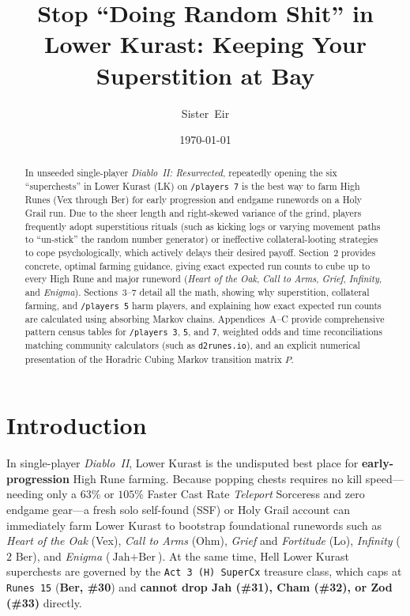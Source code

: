 \documentclass[11pt,reqno]{amsart}
\title[Mathematics and Psychology of High Rune Farming in D2R]{Stop ``Doing Random Shit'' in Lower Kurast: Keeping Your Superstition at Bay}
\author{Sister~Eir}
\date{\today}
\theoremstyle{definition}
\begin{document}
\begin{abstract}
In unseeded single-player \emph{Diablo~II: Resurrected}, repeatedly opening the six ``superchests'' in Lower Kurast (LK) on \texttt{/players~7} is the best way to farm High Runes (Vex through Ber) for early progression and endgame runewords on a Holy Grail run. Due to the sheer length and right-skewed variance of the grind, players frequently adopt superstitious rituals (such as kicking logs or varying movement paths to ``un-stick'' the random number generator) or ineffective collateral-looting strategies to cope psychologically, which actively delays their desired payoff. Section~2 provides concrete, optimal farming guidance, giving exact expected run counts to cube up to every High Rune and major runeword (\emph{Heart of the Oak}, \emph{Call to Arms}, \emph{Grief}, \emph{Infinity}, and \emph{Enigma}). Sections~3--7 detail all the math, showing why superstition, collateral farming, and \texttt{/players~5} harm players, and explaining how exact expected run counts are calculated using absorbing Markov chains. Appendices~A--C provide comprehensive pattern census tables for \texttt{/players~3}, \texttt{5}, and \texttt{7}, weighted odds and time reconciliations matching community calculators (such as \texttt{d2runes.io}), and an explicit numerical presentation of the Horadric Cubing Markov transition matrix $P$.
\end{abstract}

\maketitle

\section{Introduction}

In single-player \emph{Diablo~II}, Lower Kurast is the undisputed best place for \textbf{early-progression} High Rune farming. Because popping chests requires no kill speed—needing only a $63\%$ or $105\%$ Faster Cast Rate \emph{Teleport} Sorceress and zero endgame gear—a fresh solo self-found (SSF) or Holy Grail account can immediately farm Lower Kurast to bootstrap foundational runewords such as \emph{Heart of the Oak} (Vex), \emph{Call to Arms} (Ohm), \emph{Grief} and \emph{Fortitude} (Lo), \emph{Infinity} ($2\text{ Ber}$), and \emph{Enigma} ($\text{Jah} + \text{Ber}$). At the same time, Hell Lower Kurast superchests are governed by the \texttt{Act 3 (H) SuperCx} treasure class, which caps at \texttt{Runes 15} (\textbf{Ber, \#30}) and \textbf{cannot drop Jah (\#31), Cham (\#32), or Zod (\#33)} directly.
\end{document}
